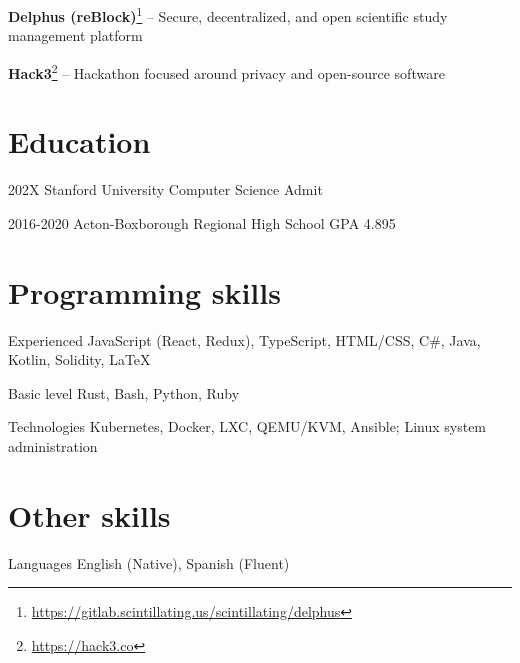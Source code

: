 \documentclass[paper=letter]{tccv}
\begin{document}
\textbf{Delphus (reBlock)}\footnote{\url{https://gitlab.scintillating.us/scintillating/delphus}} -- Secure, decentralized, and open scientific study management platform

\textbf{Hack3}\footnote{\url{https://hack3.co}} -- Hackathon focused around privacy and open-source software

\textbf{}

\section{Education}

\begin{yearlist}
     \item{202X}
          {Stanford University}
          {Computer Science Admit}
     \item{2016-2020}
          {Acton-Boxborough Regional High School}
          {GPA 4.895}
\end{yearlist}

\section{Programming skills}

\begin{factlist}

\item{Experienced}
     {JavaScript (React, Redux), TypeScript, HTML/CSS, C\#, Java, Kotlin, Solidity, \LaTeX}

\item{Basic level}
     {Rust, Bash, Python, Ruby}

\item{Technologies}
     {Kubernetes, Docker, LXC, QEMU/KVM, Ansible; Linux system administration}

\end{factlist}

\section{Other skills}

\begin{factlist}

     \item{Languages}
          {English (Native), Spanish (Fluent)}
     
\end{factlist}
\end{document}
